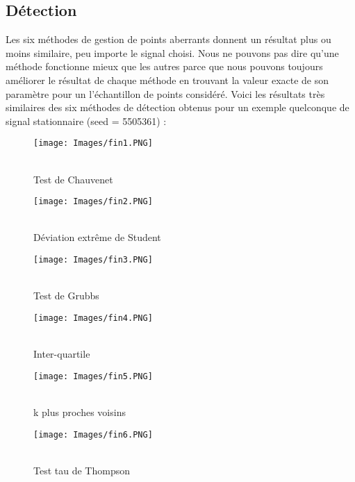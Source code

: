 \documentclass[a4paper,12pt]{article} %
\begin{document}
        \subsection{Détection}
            Les six méthodes de gestion de points aberrants donnent un résultat plus ou moins similaire, peu importe le signal choisi. Nous ne pouvons pas dire qu'une méthode fonctionne mieux que les autres parce que nous pouvons toujours améliorer le résultat de chaque méthode en trouvant la valeur exacte de son paramètre pour un l'échantillon de points considéré. Voici les résultats très similaires des six méthodes de détection obtenus pour un exemple quelconque de signal stationnaire (seed = 5505361) :
            \begin{figure}[H] %
            \texttt{[image: Images/fin1.PNG]} %
            \caption{\\Test de Chauvenet} %
            \label{m15} %
            \endminipage
            \hfill
            \endminipage
            \texttt{[image: Images/fin2.PNG]}  
            \caption{\\Déviation extrême de Student}
            \label{m5}
            \endminipage
            \hfill
            \endminipage
            \texttt{[image: Images/fin3.PNG]}  
            \caption{\\Test de Grubbs}
            \label{m35}
            \endminipage
            \end{figure}
            
            \begin{figure}[H] %
            \texttt{[image: Images/fin4.PNG]} %
            \caption{\\Inter-quartile} %
            \label{m15} %
            \endminipage
            \hfill
            \endminipage
            \texttt{[image: Images/fin5.PNG]}  
            \caption{\\k plus proches voisins}
            \label{m5}
            \endminipage
            \hfill
            \endminipage
            \texttt{[image: Images/fin6.PNG]}  
            \caption{\\Test tau de Thompson}
            \label{m35}
            \endminipage
            \end{figure}
            
\end{document}
